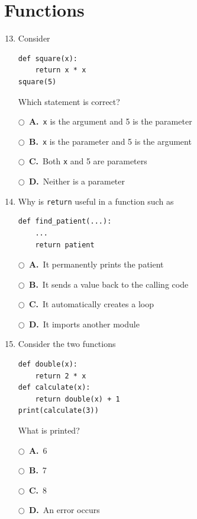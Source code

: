 \documentclass[11pt]{article}
\newcommand{\choice}[2]{%
    \par\noindent
    \(\bigcirc\)\ \textbf{#1.}\ #2
}
\begin{document}
\section*{Functions}

\begin{enumerate}
\setcounter{enumi}{12}


\item Consider

\begin{verbatim}
def square(x):
    return x * x
square(5)
\end{verbatim}

Which statement is correct?

\choice{A}{\texttt{x} is the argument and 5 is the parameter}

\choice{B}{\texttt{x} is the parameter and 5 is the argument}

\choice{C}{Both \texttt{x} and 5 are parameters}

\choice{D}{Neither is a parameter}



\item Why is \texttt{return} useful in a function such as

\begin{verbatim}
def find_patient(...):
    ...
    return patient
\end{verbatim}

\choice{A}{It permanently prints the patient}

\choice{B}{It sends a value back to the calling code}

\choice{C}{It automatically creates a loop}

\choice{D}{It imports another module}



\item Consider the two functions

\begin{verbatim}
def double(x):
    return 2 * x
def calculate(x):
    return double(x) + 1
print(calculate(3))
\end{verbatim}

What is printed?

\choice{A}{6}
\choice{B}{7}
\choice{C}{8}
\choice{D}{An error occurs}

\end{enumerate}
\end{document}
